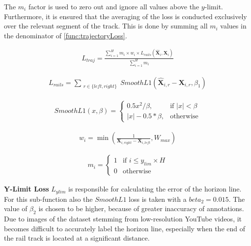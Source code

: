 The $m_{i}$ factor is used to zero out and ignore all values above the $y$-limit.
Furthermore, it is ensured that the averaging of the loss is conducted exclusively over the relevant segment of the track.
This is done by summing all $m_{i}$ values in the denominator of \autoref{func:trajectoryLoss}.

\begin{align}
    L_{traj} = \frac{\sum_{i=1}^H m_{i} \times w_{i} \times L_{rails}(\hat{\mathbf{X}}_{i},\mathbf{X}_{i})}
    {\sum_{i=1}^H m_{i}}
    \label{func:trajectoryLoss}
\end{align}

\begin{align}
    L_{rails} = \sum_{\substack{r \in \{left, right\}}} SmoothL1(\hat{\mathbf{X}}_{i,r} - \mathbf{X}_{i,r}, \beta_1)
    \label{func:smoothL1_error}
\end{align}

\begin{align}
    SmoothL1(x, \beta) = 
    \begin{cases}
        0.5 x^2 / \beta, & \text{if } |x| < \beta \\
        |x| - 0.5 * \beta, & \text{otherwise}
    \end{cases}
    \label{func:smoothL1}
\end{align}

\begin{align}
    w_{i} = \min \left( \frac{1}{\mathbf{X}_{i,right} - \mathbf{X}_{i,left}} , W_{max} \right)
    \label{func:perspective_weight}
\end{align}

\begin{align}
    m_i = 
    \begin{cases} 
        1 & \text{if } i \leq y_{lim} \times H \\
        0 & \text{otherwise}
    \end{cases}
    \label{func:maskingFactor}
\end{align}

\vspace{1cm}

\noindent \textbf{Y-Limit Loss} $L_{ylim}$ is responsible for calculating the error of the horizon line.
For this sub-function also the $SmoothL1$ loss is taken with a $beta_{2} = 0.015$.
The value of $\beta_{2}$ is chosen to be higher, because of greater inaccuracy of annotations.
Due to images of the dataset stemming from low-resolution YouTube videos, it becomes difficult to accurately label the horizon line, especially when the end of the rail track is located at a significant distance.

